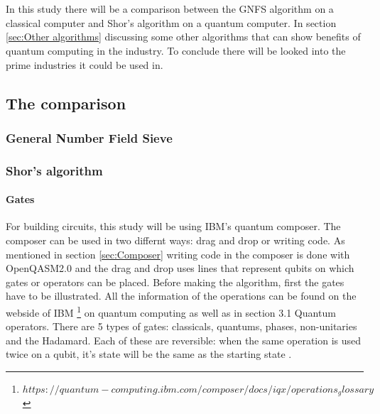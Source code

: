
\chapter{}
\label{ch:onderzoek}



In this study there will be a comparison between the GNFS algorithm on a classical computer and Shor's algorithm on a quantum computer.
In section \ref{sec:Other algorithms} discussing some other algorithms that can show benefits of quantum computing in the industry. To conclude there will be looked into the prime industries it could be used in.

\section{The comparison}
\subsection{General Number Field Sieve}
\subsection{Shor's algorithm}
\subsubsection{Gates}
\label{subsubsec:gates}
For building circuits, this study will be using IBM's quantum composer. The composer can be used in two differnt ways: drag and drop or writing code.
As mentioned in section \ref{sec:Composer} writing code in the composer is done with OpenQASM2.0 and the drag and drop uses lines that represent qubits on which gates or operators can be placed.
Before making the algorithm, first the gates have to be illustrated. All the information of the operations can be found on the webside of IBM \footnote{$https://quantum-computing.ibm.com/composer/docs/iqx/operations_glossary$} on quantum computing as well as in \textcite{Hidary_2019} section 3.1 Quantum operators.
There are 5 types of gates: classicals, quantums, phases, non-unitaries and the Hadamard. Each of these are reversible: when the same operation is used twice on a qubit, it's state will be the same as the starting state \autocite{reversible_gates, revgates}.

